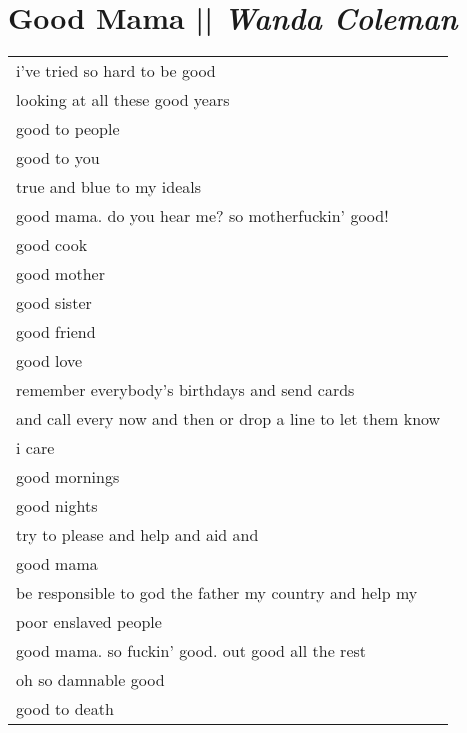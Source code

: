 
\section[Good Mama]{Good Mama || \emph{Wanda Coleman} \hspace*{\fill}  \thepage}
\label{sec:Good_Mama.tex}
\vspace*{0.7cm}
\begin{center}
\begin{tabular}{l}
i've tried so hard to be good\\
looking at all these good years\\
good to people\\
good to you\\
true and blue to my ideals\\
good mama. do you hear me? so motherfuckin' good!\\
good cook\\
good mother\\
good sister\\
good friend\\
good love\\
remember everybody's birthdays and send cards\\
and call every now and then or drop a line to let them know\\
i care\\
good mornings\\
good nights\\
try to please and help and aid and\\
good mama\\
be responsible to god the father my country and help my\\
poor enslaved people\\
good mama. so fuckin' good. out good all the rest\\
oh so damnable good\\
good to death
\end{tabular}
\end{center}